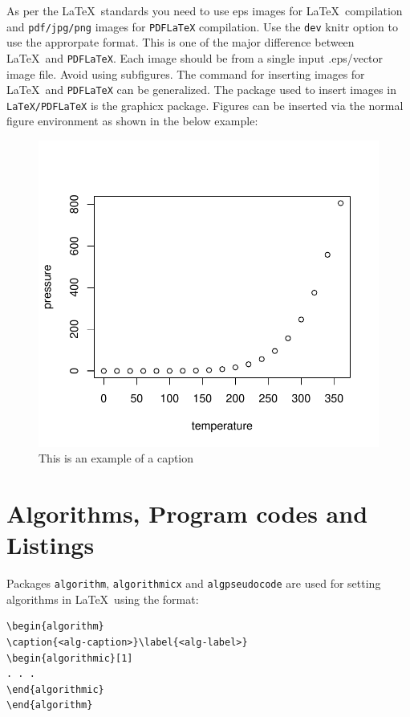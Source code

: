 \documentclass[sn-vancouver,Numbered,pdflatex]{sn-jnl}
\theoremstyle{remark}
\theoremstyle{definition}
\begin{document}
As per the \LaTeX~standards you need to use eps images for
\LaTeX~compilation and \texttt{pdf/jpg/png} images for \texttt{PDFLaTeX}
compilation. Use the \texttt{dev} knitr option to use the approrpate
format. This is one of the major difference between \LaTeX~and
\texttt{PDFLaTeX}. Each image should be from a single input .eps/vector
image file. Avoid using subfigures. The command for inserting images for
\LaTeX~and \texttt{PDFLaTeX} can be generalized. The package used to
insert images in \texttt{LaTeX/PDFLaTeX} is the graphicx package.
Figures can be inserted via the normal figure environment as shown in
the below example:

\begin{figure}
\includegraphics{Springer-test_files/figure-latex/fig1-1} \caption{This is an example of a caption}\label{fig:fig1}
\end{figure}

\hypertarget{sec7}{%
\section{Algorithms, Program codes and Listings}\label{sec7}}

Packages \texttt{algorithm}, \texttt{algorithmicx} and
\texttt{algpseudocode} are used for setting algorithms in \LaTeX~using
the format:

\begin{verbatim}
\begin{algorithm}
\caption{<alg-caption>}\label{<alg-label>}
\begin{algorithmic}[1]
. . .
\end{algorithmic}
\end{algorithm}
\end{verbatim}
\end{document}
